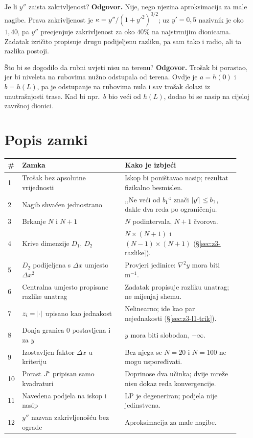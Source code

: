 \begin{pitanje}{Je li $y''$ zaista zakrivljenost?}
\textbf{Odgovor.} Nije, nego njezina aproksimacija za male nagibe. Prava
zakrivljenost je $\kappa = y''/(1 + y'^2)^{3/2}$; uz $y' = 0{,}5$ nazivnik je
oko $1{,}40$, pa $y''$ precjenjuje zakrivljenost za oko $40\%$ na najstrmijim
dionicama. Zadatak izričito propisuje drugu podijeljenu razliku, pa sam tako i
radio, ali ta razlika postoji.
\end{pitanje}

\begin{pitanje}{Što bi se dogodilo da rubni uvjeti nisu na terenu?}
\textbf{Odgovor.} Trošak bi porastao, jer bi niveleta na rubovima nužno odstupala
od terena. Ovdje je $a = h(0)$ i $b = h(L)$, pa je odstupanje na rubovima nula i
sav trošak dolazi iz unutrašnjosti trase. Kad bi npr.\ $b$ bio veći od $h(L)$,
dodao bi se nasip na cijeloj završnoj dionici.
\end{pitanje}

\section{Popis zamki}
\label{sec:z3o-zamke}

\begin{longtable}{@{}p{0.05\linewidth} p{0.42\linewidth} p{0.47\linewidth}@{}}
\toprule
\textbf{\#} & \textbf{Zamka} & \textbf{Kako je izbjeći} \\
\midrule
\endhead
1 & Trošak bez apsolutne vrijednosti & Iskop bi poništavao nasip; rezultat
fizikalno besmislen. \\[5pt]
2 & Nagib shvaćen jednostrano & ,,Ne veći od $b_1$`` znači
$\left\lvert y' \right\rvert \leq b_1$, dakle dva reda po ograničenju. \\[5pt]
3 & Brkanje $N$ i $N+1$ & $N$ podintervala, $N+1$ čvorova. \\[5pt]
4 & Krive dimenzije $D_1$, $D_2$ & $N \times (N{+}1)$ i $(N{-}1) \times (N{+}1)$
(\S\ref{sec:z3-razlike}). \\[5pt]
5 & $D_2$ podijeljena s $\Delta x$ umjesto $\Delta x^2$ & Provjeri jedinice:
$\nabla^2 y$ mora biti $\mathrm{m}^{-1}$. \\[5pt]
6 & Centralna umjesto propisane razlike unatrag & Zadatak propisuje razliku
unatrag; ne mijenjaj shemu. \\[5pt]
7 & $z_i = \left\lvert \cdot \right\rvert$ upisano kao jednakost & Nelinearno; ide kao par
nejednakosti (\S\ref{sec:z3-l1-trik}). \\[5pt]
8 & Donja granica $0$ postavljena i za $y$ & $y$ mora biti slobodan,
$-\infty$. \\[5pt]
9 & Izostavljen faktor $\Delta x$ u kriteriju & Bez njega se $N = 20$ i
$N = 100$ ne mogu uspoređivati. \\[5pt]
10 & Porast $J^{\star}$ pripisan samo kvadraturi & Doprinose dva učinka; dvije
mreže nisu dokaz reda konvergencije. \\[5pt]
11 & Navedena podjela na iskop i nasip & LP je degeneriran; podjela nije
jedinstvena. \\[5pt]
12 & $y''$ nazvan zakrivljenošću bez ograde & Aproksimacija za male nagibe. \\
\bottomrule
\end{longtable}

